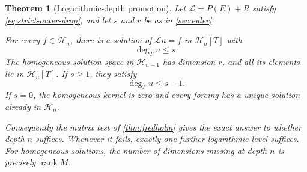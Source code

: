 \documentclass[11pt,a4paper]{article}
\numberwithin{equation}{section}
\newtheorem{theorem}{Theorem}[section]
\theoremstyle{definition}
\theoremstyle{remark}
\newcommand{\HH}{\mathcal H}
\newcommand{\cL}{\mathcal L}
\newcommand{\rank}{\operatorname{rank}}
\begin{document}
\begin{theorem}[Logarithmic-depth promotion]
\label{thm:promotion}
Let $\cL=P(E)+R$ satisfy \eqref{eq:strict-outer-drop}, and let $s$ and $r$ be as in \cref{sec:euler}.

For every $f\in\HH_n$, there is a solution of $\cL u=f$ in $\HH_n[T]$ with
\begin{equation}
 \deg_T u\le s.
 \label{eq:inhom-degree}
\end{equation}
The homogeneous solution space in $\HH_{n+1}$ has dimension $r$, and all its elements lie in $\HH_n[T]$. If $s\ge1$, they satisfy
\begin{equation}
 \deg_T u\le s-1.
 \label{eq:hom-degree}
\end{equation}
If $s=0$, the homogeneous kernel is zero and every forcing has a unique solution already in $\HH_n$.

Consequently the matrix test of \cref{thm:fredholm} gives the exact answer to whether depth $n$ suffices. Whenever it fails, exactly one further logarithmic level suffices. For homogeneous solutions, the number of dimensions missing at depth $n$ is precisely $\rank M$.
\end{theorem}
\end{document}
